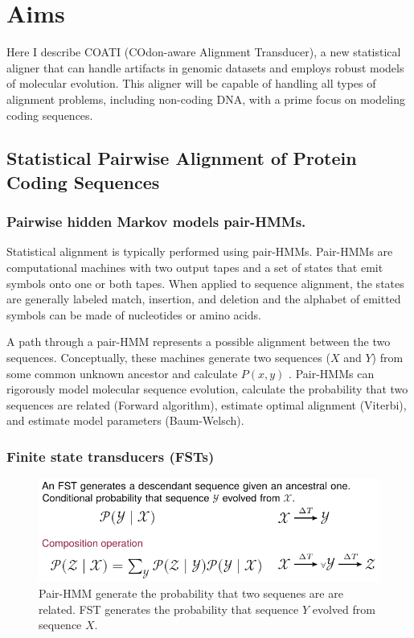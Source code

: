 \section{Aims}
Here I describe COATI (COdon-aware Alignment Transducer), a new statistical
aligner that can handle artifacts in genomic datasets and employs robust models
of molecular evolution.
This aligner will be capable of handling all types of alignment problems,
including non-coding DNA, with a prime focus on modeling coding sequences.

\subsection{Statistical Pairwise Alignment of Protein Coding Sequences}

\subsubsection{Pairwise hidden Markov models pair-HMMs.}
Statistical alignment is typically performed using pair-HMMs.
Pair-HMMs are computational machines with two output tapes and a set of states
that emit symbols onto one or both tapes.
When applied to sequence alignment, the states are generally labeled match,
insertion, and deletion and the alphabet of emitted symbols can be made of
nucleotides or amino acids.

A path through a pair-HMM represents a possible alignment between the two
sequences.
Conceptually, these machines generate two sequences ($X$ and $Y$) from some
common unknown ancestor and calculate $P(x,y)$
\parencite{yoon_2009_hmm}.
Pair-HMMs can rigorously model molecular sequence evolution, calculate the
probability that two sequences are related (Forward algorithm), estimate optimal
alignment (Viterbi), and estimate model parameters (Baum-Welsch).

\subsubsection{Finite state transducers (FSTs)}

\begin{figure}
\vspace{-2em}
\centering
\begin{framed}
    \includegraphics[scale=1]{figures/fig-fst.pdf}
    \caption{Pair-HMM generate the probability that two sequenes are are
             related. FST generates the probability that sequence $Y$ evolved
             from sequence $X$.}
    \label{fig:fst}
\end{framed}
\end{figure}

